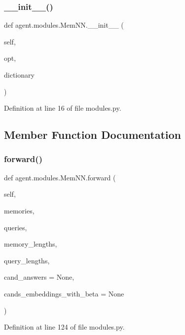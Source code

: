 \subsubsection{\texorpdfstring{\+\_\+\+\_\+init\+\_\+\+\_\+()}{\_\_init\_\_()}}
{\footnotesize\ttfamily def agent.\+modules.\+Mem\+N\+N.\+\_\+\+\_\+init\+\_\+\+\_\+ (\begin{DoxyParamCaption}\item[{}]{self,  }\item[{}]{opt,  }\item[{}]{dictionary }\end{DoxyParamCaption})}



Definition at line 16 of file modules.\+py.



\subsection{Member Function Documentation}
\mbox{\label{classagent_1_1modules_1_1MemNN_aa4fbd692135afd7ec2fa94afafe34b73}} 
\subsubsection{\texorpdfstring{forward()}{forward()}}
{\footnotesize\ttfamily def agent.\+modules.\+Mem\+N\+N.\+forward (\begin{DoxyParamCaption}\item[{}]{self,  }\item[{}]{memories,  }\item[{}]{queries,  }\item[{}]{memory\+\_\+lengths,  }\item[{}]{query\+\_\+lengths,  }\item[{}]{cand\+\_\+answers = {\ttfamily None},  }\item[{}]{cands\+\_\+embeddings\+\_\+with\+\_\+beta = {\ttfamily None} }\end{DoxyParamCaption})}



Definition at line 124 of file modules.\+py.



